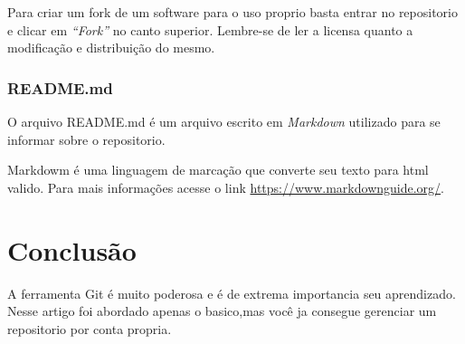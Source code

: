 \documentclass[]{article}
\begin{document}
Para criar um fork de um software para o uso proprio basta entrar no repositorio e clicar em \textit{``Fork''} no canto superior.
Lembre-se de ler a licensa quanto a modificação e distribuição do mesmo.

\subsubsection*{README.md}

O arquivo README.md é um arquivo escrito em \textit{Markdown} utilizado para se informar sobre o repositorio.

Markdowm é uma linguagem de marcação que converte seu texto para html valido. 
Para mais informações acesse o link \url{https://www.markdownguide.org/}.
\section{Conclusão}
A ferramenta Git é muito poderosa e é de extrema importancia seu aprendizado.
Nesse artigo foi abordado apenas o basico,mas você ja consegue gerenciar um repositorio por conta propria.















\printbibliography 
\end{document}
